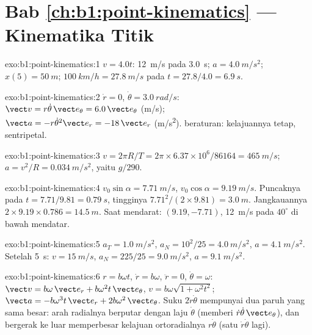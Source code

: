 \section*{Bab \ref{ch:b1:point-kinematics} --- Kinematika Titik}

\begin{solution}{exo:b1:point-kinematics:1}
$v = 4.0t$: \qty{12}{m/s} pada \qty{3.0}{s}; $a = \qty{4.0}{m/s^2}$;
$x(5) = \qty{50}{m}$; $\qty{100}{km/h} = \qty{27.8}{m/s}$ pada $t = 27.8/4.0
= \qty{6.9}{s}$.
\end{solution}

\begin{solution}{exo:b1:point-kinematics:2}
$\dot r = 0$, $\dot\theta = \qty{3.0}{rad/s}$: $\vect v = r\dot\theta\,\vect e_\theta
= 6.0\,\vect e_\theta$ (\unit{m/s}); $\vect a = -r\dot\theta^2\vect e_r =
-18\,\vect e_r$ (\unit{m/s^2}).  beraturan: kelajuannya
tetap,  sentripetal.
\end{solution}

\begin{solution}{exo:b1:point-kinematics:3}
$v = 2\pi R/T = 2\pi \times 6.37\times10^6/86164 = \qty{465}{m/s}$;
$a = v^2/R = \qty{0.034}{m/s^2}$, yaitu $g/290$.
\end{solution}

\begin{solution}{exo:b1:point-kinematics:4}
$v_0\sin\alpha = \qty{7.71}{m/s}$, $v_0\cos\alpha = \qty{9.19}{m/s}$.
Puncaknya pada $t = 7.71/9.81 = \qty{0.79}{s}$, tingginya $7.71^2/(2 \times 9.81) =
\qty{3.0}{m}$. Jangkauannya $2 \times 9.19 \times 0.786 = \qty{14.5}{m}$.
Saat mendarat: $(9.19, -7.71)$, \qty{12}{m/s} pada $40^\circ$ di bawah
mendatar.
\end{solution}

\begin{solution}{exo:b1:point-kinematics:5}
$a_T = \qty{1.0}{m/s^2}$, $a_N = 10^2/25 = \qty{4.0}{m/s^2}$, $a =
\qty{4.1}{m/s^2}$. Setelah \qty{5}{s}: $v = \qty{15}{m/s}$, $a_N = 225/25 =
\qty{9.0}{m/s^2}$, $a = \qty{9.1}{m/s^2}$.
\end{solution}

\begin{solution}{exo:b1:point-kinematics:6}
$r = b\omega t$, $\dot r = b\omega$, $\ddot r = 0$, $\dot\theta = \omega$:
$\vect v = b\omega\,\vect e_r + b\omega^2 t\,\vect e_\theta$, $v = b\omega
\sqrt{1 + \omega^2t^2}$; $\vect a = -b\omega^3 t\,\vect e_r + 2b\omega^2\,
\vect e_\theta$. Suku $2\dot r\dot\theta$ mempunyai dua paruh yang sama
besar: arah  radialnya berputar dengan laju $\dot\theta$
(memberi $\dot r\dot\theta\,\vect e_\theta$), dan bergerak ke luar
memperbesar kelajuan ortoradialnya $r\dot\theta$ (satu $\dot r\dot\theta$ lagi).
\end{solution}

